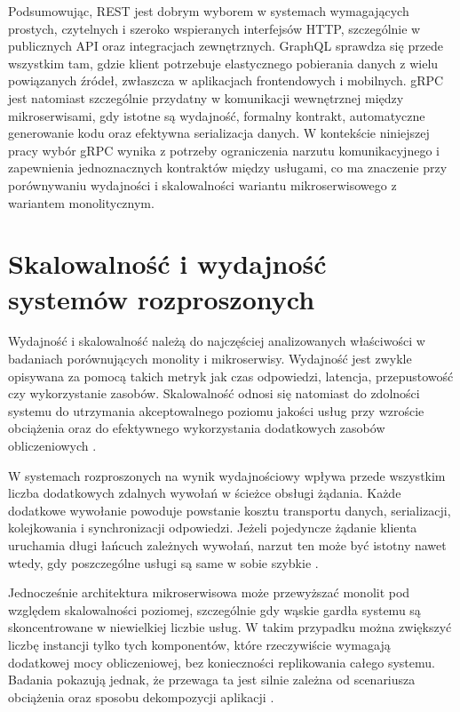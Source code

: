 Podsumowując, REST jest dobrym wyborem w systemach wymagających prostych, czytelnych i szeroko wspieranych interfejsów HTTP, szczególnie w publicznych API oraz integracjach zewnętrznych. GraphQL sprawdza się przede wszystkim tam, gdzie klient potrzebuje elastycznego pobierania danych z wielu powiązanych źródeł, zwłaszcza w aplikacjach frontendowych i mobilnych. gRPC jest natomiast szczególnie przydatny w komunikacji wewnętrznej między mikroserwisami, gdy istotne są wydajność, formalny kontrakt, automatyczne generowanie kodu oraz efektywna serializacja danych. W kontekście niniejszej pracy wybór gRPC wynika z potrzeby ograniczenia narzutu komunikacyjnego i zapewnienia jednoznacznych kontraktów między usługami, co ma znaczenie przy porównywaniu wydajności i skalowalności wariantu mikroserwisowego z wariantem monolitycznym.

\section{Skalowalność i wydajność systemów rozproszonych}
\label{sec:scalability-performance}

Wydajność i skalowalność należą do najczęściej analizowanych właściwości w badaniach porównujących monolity i mikroserwisy. Wydajność jest zwykle opisywana za pomocą takich metryk jak czas odpowiedzi, latencja, przepustowość czy wykorzystanie zasobów. Skalowalność odnosi się natomiast do zdolności systemu do utrzymania akceptowalnego poziomu jakości usług przy wzroście obciążenia oraz do efektywnego wykorzystania dodatkowych zasobów obliczeniowych \cite{ avritzer2020scalability, li2021microservices, blinowski2022monolithic}.


W systemach rozproszonych na wynik wydajnościowy wpływa przede wszystkim liczba dodatkowych zdalnych wywołań w ścieżce obsługi żądania. Każde dodatkowe wywołanie powoduje powstanie kosztu transportu danych, serializacji, kolejkowania i synchronizacji odpowiedzi. Jeżeli pojedyncze żądanie klienta uruchamia długi łańcuch zależnych wywołań, narzut ten może być istotny nawet wtedy, gdy poszczególne usługi są same w sobie szybkie \cite{shadija2017granularity}.

Jednocześnie architektura mikroserwisowa może przewyższać monolit pod względem skalowalności poziomej, szczególnie gdy wąskie gardła systemu są skoncentrowane w niewielkiej liczbie usług. W takim przypadku można zwiększyć liczbę instancji tylko tych komponentów, które rzeczywiście wymagają dodatkowej mocy obliczeniowej, bez konieczności replikowania całego systemu. Badania pokazują jednak, że przewaga ta jest silnie zależna od scenariusza obciążenia oraz sposobu dekompozycji aplikacji \cite{jayasinghe2020decomposition}.

